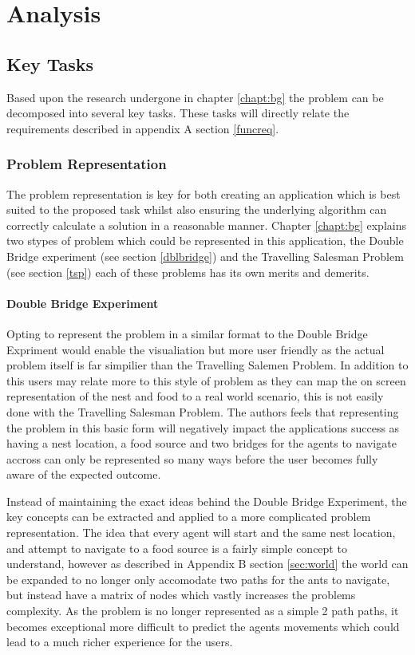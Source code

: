 

\chapter{Analysis}
\label{chap:analysis}
\section{Key Tasks}

Based upon the research undergone in chapter \ref{chapt:bg} the problem can be decomposed into several key tasks. These tasks will directly relate the requirements described in appendix A section \ref{funcreq}.

\subsection{Problem Representation}

The problem representation is key for both creating an application which is best suited to the proposed task whilst also ensuring the underlying algorithm can correctly calculate a solution in a reasonable manner. Chapter \ref{chapt:bg} explains two stypes of problem which could be represented in this application, the Double Bridge experiment (see section \ref{dblbridge}) and the Travelling Salesman Problem (see section \ref{tsp}) each of these problems has its own merits and demerits.

\subsubsection{Double Bridge Experiment}

Opting to represent the problem in a similar format to the Double Bridge Expriment would enable the visualiation but more user friendly as the actual problem itself is far simpilier than the Travelling Salemen Problem. In addition to this users may relate more to this style of problem as they can map the on screen representation of the nest and food to a real world scenario, this is not easily done with the Travelling Salesman Problem. The authors feels that representing the problem in this basic form will negatively impact the applications success as having a nest location, a food source and two bridges for the agents to navigate accross can only be represented so many ways before the user becomes fully aware of the expected outcome.

Instead of maintaining the exact ideas behind the Double Bridge Experiment, the key concepts can be extracted and applied to a more complicated problem representation. The idea that every agent will start and the same nest location, and attempt to navigate to a food source is a fairly simple concept to understand, however as described in Appendix B section \ref{sec:world} the world can be expanded to no longer only accomodate two paths for the ants to navigate, but instead have a matrix of nodes which vastly increases the problems complexity. As the problem is no longer represented as a simple 2 path paths, it becomes exceptional more difficult to predict the agents movements which could lead to a much richer experience for the users.

